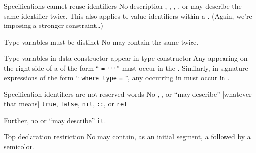 \begin{clause}{Specifications cannot reuse identifiers}
No description , ,
, , or 
may describe the same identifier twice. This also applies to value
identifiers within a . (Again, we're imposing a
stronger constraint\dots)
\end{clause}

\begin{clause}{Type variables must be distinct}
No  may contain the same  twice.
\end{clause}

\begin{clause}{Type variables in data constructor appear in type constructor}
Any  appearing on the right side of a
 of the form ``
 \texttt{=} $\mathinner{{}^{\textstyle .\,.\,.}}$'' must occur in the
. Similarly, in signature expressions of the form
`` \texttt{where type} 
 \texttt{=} '', any
 occurring in  must occur in . 
\end{clause}

\begin{clause}{Specification identifiers are not reserved words}
No , , or 
``may describe'' [whatever that means] \texttt{true}, \texttt{false},
\texttt{nil}, \texttt{::}, or \texttt{ref}.

Further, no  or  ``may describe''
\texttt{it}. 
\end{clause}

\begin{comment}{Constraining our deviation}
So our deviation~\zref{deviation:no-redefinitions} from the ``full''
language imposed the constraint that redefinitions are illegal, but we
can ``shadow'' an identifier if it is inside a structure. We see
that the Definition further limits the possible identifiers we can
shadow \emph{in general}.
\end{comment}

\begin{clause}{Top declaration restriction}
No  may contain, as an initial segment, a
 followed by a semicolon.
\end{clause}

